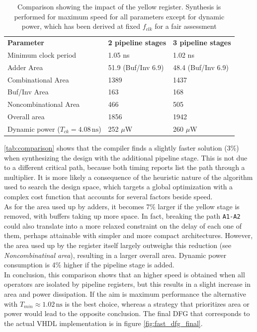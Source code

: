\begin{table}[h]
	\centering
\begin{tabular}{|l|l|l|}
	\hline
\textbf{Parameter}	&  \textbf{2 pipeline stages} & \textbf{3 pipeline stages} \\\hhline{|=|=|=|}
Minimum clock period & 1.05 ns & 1.02 ns\\\hline
Adder Area & 51.9 (Buf/Inv 6.9) & 48.4 (Buf/Inv 6.9)\\
Combinational Area & 1389 & 1437\\
Buf/Inv Area& 163 & 168\\
Noncombinational Area& 466 & 505\\
Overall area & 1856 & 1942\\
\hline
Dynamic power ($T_{ck}=4.08\,\textrm{ns}$) & 252 $\mu$W & 260 $\mu$W \\
\hline
\end{tabular}
\caption{Comparison showing the impact of the yellow register. Synthesis is performed for maximum speed for all parameters except for dynamic power, which has been derived at fixed $f_{clk}$ for a fair assessment}
\label{tab:comparison}
\end{table}

\autoref{tab:comparison} shows that the compiler finds a slightly faster solution (3\%) when synthesizing the design with the additional pipeline stage. This is not due to a different critical path, because both timing reports list the path through a multiplier. It is more likely a consequence of the heuristic nature of the algorithm used to search the design space, which targets a global optimization with a complex cost function that accounts for several factors beside speed.\\
As for the area used up by adders, it becomes 7\% larger if the yellow stage is removed, with buffers taking up more space. In fact, breaking the path \texttt{A1-A2} could also translate into a more relaxed constraint on the delay of each one of them, perhaps attainable with simpler and more compact architectures. However, the area used up by the register itself largely outweighs this reduction (see \textit{Noncombinatinal area}), resulting in a larger overall area. Dynamic power consumption is 4\% higher if the pipeline stage is added. 
\\In conclusion, this comparison shows that an higher speed is obtained when all operators are isolated by pipeline registers, but this results in a slight increase in area and power dissipation. If the aim is maximum performance the alternative with $T_{min}\approx 1.02 \,\textrm{ns}$ is the best choice, whereas a strategy that prioritizes area or power would lead to the opposite conclusion.
The final DFG that corresponds to the actual VHDL implementation is in figure \ref{fig:fast_dfg_final}.
